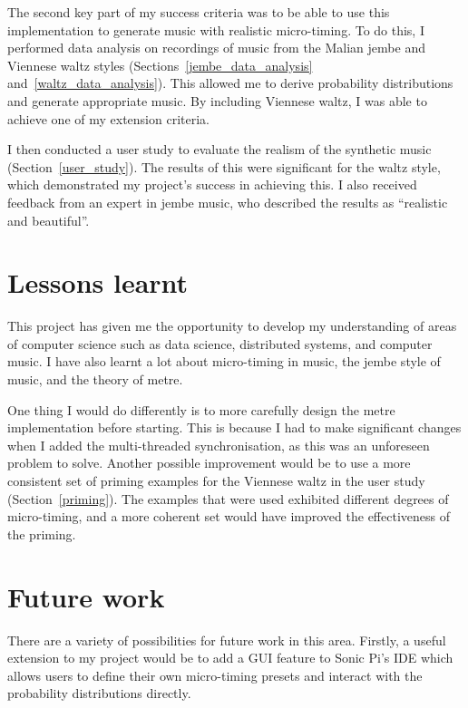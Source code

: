 \documentclass[12pt,twoside,openright]{report}
\begin{document}
The second key part of my success criteria was to be able to use this
implementation to generate music with realistic micro-timing. To do this, I
performed data analysis on recordings of music from the Malian jembe and
Viennese waltz styles (Sections~\ref{jembe_data_analysis} and~\ref{waltz_data_analysis}). This allowed me to derive probability distributions and
generate appropriate music. By including Viennese waltz, I was able to achieve
one of my extension criteria.

I then conducted a user study to evaluate the realism of the synthetic music (Section~\ref{user_study}).
The results of this were significant for the waltz style, which demonstrated my
project's success in achieving this. I also received feedback from an expert in
jembe music, who described the results as ``realistic and beautiful''.



\section{Lessons learnt} \label{lessons_learnt}

This project has given me the opportunity to develop my understanding of areas
of computer science such as data science, distributed systems, and computer music. I have also learnt a lot about micro-timing in music, the jembe
style of music, and the theory of metre.

One thing I would do differently is to more carefully design the metre
implementation before starting. This is because I had to make significant
changes when I added the multi-threaded synchronisation, as this was an
unforeseen problem to solve. Another possible improvement would be to
use a more consistent set of priming examples for the Viennese waltz in the user
study (Section~\ref{priming}). The examples that were used exhibited different degrees of
micro-timing, and a more coherent set would have improved the effectiveness of
the priming.



\section{Future work} \label{future_work}

There are a variety of possibilities for future work in this area. Firstly, a
useful extension to my project would be to add a GUI feature to Sonic Pi's IDE
which allows users to define their own micro-timing presets and interact with
the probability distributions directly.
\end{document}
